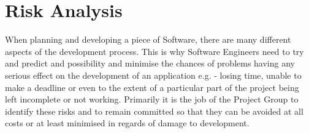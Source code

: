 \documentclass[titlepage]{article}
\begin{document}
\section{Risk Analysis}
When planning and developing a piece of Software, there are many different aspects of the development process. This is why Software Engineers need to try and predict and possibility and minimise the chances of problems having any serious effect on the development of an application e.g. - losing time, unable to make a deadline or even to the extent of a particular part of the project being left incomplete or not working.
\newline
Primarily it is the job of the Project Group to identify these risks and to remain committed so that they can be avoided at all costs or at least minimised in regards of damage to development.\\
\end{document}
